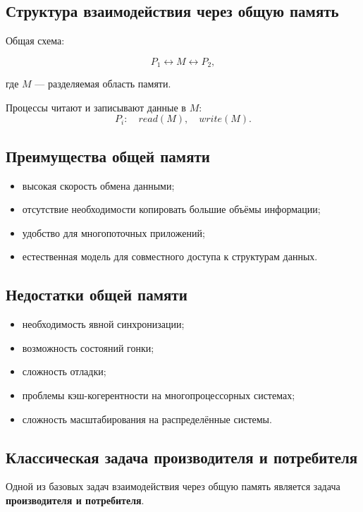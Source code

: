 \documentclass[12pt,a4paper]{article}
\begin{document}
\subsection{Структура взаимодействия через общую память}

Общая схема:

\[
P_1 \leftrightarrow M \leftrightarrow P_2,
\]

где $M$ --- разделяемая область памяти.

Процессы читают и записывают данные в $M$:
\[
P_i: \quad read(M), \quad write(M).
\]

\subsection{Преимущества общей памяти}

\begin{itemize}
    \item высокая скорость обмена данными;
    \item отсутствие необходимости копировать большие объёмы информации;
    \item удобство для многопоточных приложений;
    \item естественная модель для совместного доступа к структурам данных.
\end{itemize}

\subsection{Недостатки общей памяти}

\begin{itemize}
    \item необходимость явной синхронизации;
    \item возможность состояний гонки;
    \item сложность отладки;
    \item проблемы кэш-когерентности на многопроцессорных системах;
    \item сложность масштабирования на распределённые системы.
\end{itemize}

\subsection{Классическая задача производителя и потребителя}

Одной из базовых задач взаимодействия через общую память является задача \textbf{производителя и потребителя}.
\end{document}

